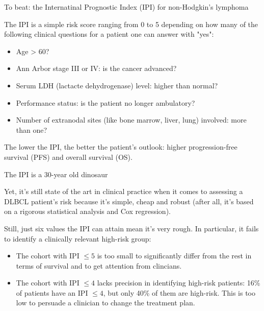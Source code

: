 \documentclass[10pt, aspectratio=169]{beamer}
\begin{document}
\begin{frame}{To beat: the Internatinal Prognostic Index (IPI) for non-Hodgkin's lymphoma}

  The IPI \autocite{ipi93} is a simple risk score ranging from 0 to 5 depending on how many of the following 
  \alert{clinical} questions for a patient one can answer with "yes": 

  \begin{itemize}
    \item Age > 60?
    \item Ann Arbor stage III or IV: is the cancer advanced?
    \item Serum LDH (lactacte dehydrogenase) level: higher than normal?
    \item Performance status: is the patient no longer ambulatory? 
    \item Number of extranodal sites (like bone marrow, liver, lung) involved: more than one?
  \end{itemize}

  The lower the IPI, the better the patient's outlook: higher progression-free survival (PFS) and 
  overall survival (OS).

\end{frame}

\begin{frame}{The IPI is a 30-year old dinosaur}

  Yet, it's still state of the art in clinical practice when it comes to assessing a DLBCL 
  patient's risk  because it's \alert{simple}, \alert{cheap} and 
  \alert{robust} (after all, it's based on a rigorous statistical analysis and Cox regression).

  Still, just six values the IPI can attain mean it's very rough. In particular, it fails 
  to identify a clinically relevant high-risk group:

  \begin{itemize}
    \item The cohort with IPI $\leq 5$ is \alert{too small} to significantly differ from the rest in terms 
    of survival and to get attention from clincians.
    \item The cohort with IPI $\leq 4$ \alert{lacks precision in identifying high-risk patients}: 16\% of
    patients have an IPI $\leq 4$, but only 40\% of them are high-risk. This is too low to persuade 
    a clinician to change the treatment plan.
  \end{itemize}

\end{frame}
\end{document}
